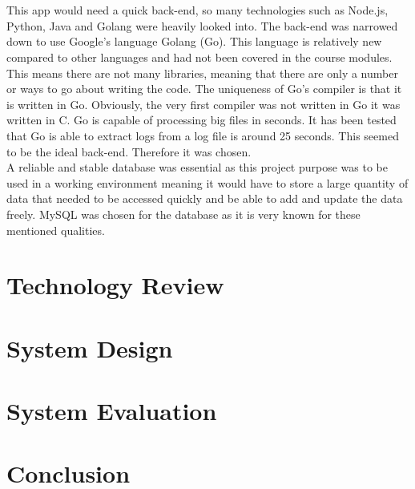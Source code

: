 \documentclass{article}
\begin{document}
\\\\ This app would need a quick back-end, so many technologies such as Node.js, Python, Java and Golang were heavily looked into. The back-end was narrowed down to use Google's language Golang (Go). This language is relatively new compared to other languages and had not been covered in the course modules. This means there are not many libraries, meaning that there are only a number or ways to go about writing the code.  The uniqueness of Go's compiler is that it is written in Go. Obviously, the very first compiler was not written in Go it was written in C. Go is capable of processing big files in seconds. It has been tested that Go is able to extract logs from a log file is around 25 seconds. This seemed to be the ideal back-end. Therefore it was chosen.
\\ A reliable and stable database was essential as this project purpose was to be used in a working environment meaning it would have to store a large quantity of data that needed to be accessed quickly and be able to add and update the data freely. MySQL was chosen for the database as it is very known for these mentioned qualities. 

\section{Technology Review}

\section{System Design}

\section{System Evaluation}

\section{Conclusion}

\newpage





\end{document}
